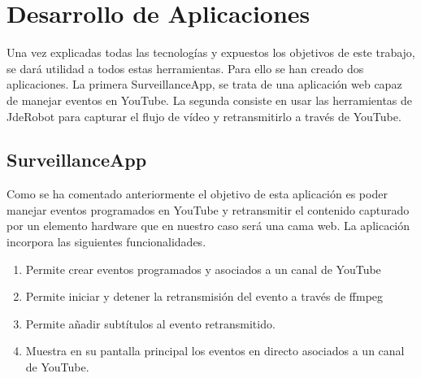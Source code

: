 \chapter{Desarrollo de Aplicaciones}

Una vez explicadas todas las tecnologías y expuestos los objetivos de este trabajo, se dará utilidad a todos estas herramientas. Para ello se han creado dos aplicaciones. La primera SurveillanceApp, se trata de una aplicación web capaz de manejar eventos en YouTube. La segunda consiste en usar las herramientas de JdeRobot para capturar el flujo de vídeo y retransmitirlo a través de YouTube.

\section{SurveillanceApp}

Como se ha comentado anteriormente el objetivo de esta aplicación es poder manejar eventos programados en YouTube y retransmitir el contenido capturado por un elemento hardware que en nuestro caso será una cama web. La aplicación incorpora las siguientes funcionalidades.

\begin{enumerate}
    \item Permite crear eventos programados y asociados a un canal de YouTube
    \item Permite iniciar y detener la retransmisión del evento a través de ffmpeg
    \item Permite añadir subtítulos al evento retransmitido.
    \item Muestra en su pantalla principal los eventos en directo asociados a un canal de YouTube.

\end{enumerate}

